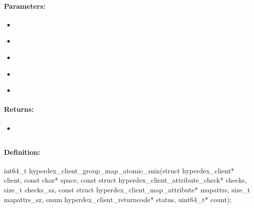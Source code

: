 \paragraph{Parameters:}
\begin{itemize}[noitemsep]
\item {}\\

\item {}\\

\item {}\\

\item {}\\

\item {}\\

\end{itemize}

\paragraph{Returns:}
\begin{itemize}[noitemsep]
\item {}\\

\end{itemize}

\pagebreak
\subsection{}
\label{api:c:group_map_atomic_min}


\paragraph{Definition:}
\begin{ccode}
int64_t hyperdex_client_group_map_atomic_min(struct hyperdex_client* client,
        const char* space,
        const struct hyperdex_client_attribute_check* checks, size_t checks_sz,
        const struct hyperdex_client_map_attribute* mapattrs, size_t mapattrs_sz,
        enum hyperdex_client_returncode* status,
        uint64_t* count);
\end{ccode}

